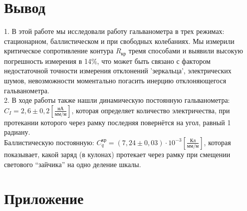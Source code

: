 \documentclass[a4paper,12pt]{article} %
\begin{document}
\section{Вывод}
1. В этой работе мы исследовали работу гальванометра в трех режимах: стационарном, баллистическом и при свободных колебаниях. Мы измерили критическое сопротивление контура $R_\text{кр}$ тремя способами и выявили высокую погрешность измерения в 14\%, что может быть связано с фактором недостаточной точности измерения отклонений 'зеркальца', электрических шумов, невозможности моментально погасить инерцию отклоняющегося гальванометра. 
\\
2. В ходе работы также нашли динамическую постоянную гальванометра: $C_I = 2,6 \pm0,2 \left[\frac{\text{нА}}{\text{мм/м}}\right]$, которая определяет количество электричества, при протекании которого через рамку последняя повернётся на угол, равный 1 радиану. 
\\
Баллистическую постоянную: $C_q^\text{кр} =(7,24 \pm 0,03) \cdot 10^{-3} \left[ \frac{\text{Кл}}{\text{мм/м}}\right]$, которая показывает, какой заряд (в кулонах) протекает через рамку при смещении светового “зайчика” на одно деление шкалы.

\section{Приложение}
\end{document}
